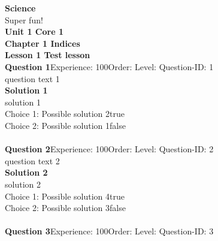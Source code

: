 \documentclass{article}
\begin{document}
\noindent\Huge{\textbf{Science}}\\[5pt]
\noindent\large{Super fun!}\\[20pt]
\noindent\huge{\textbf{Unit 1 Core 1}}\\[18pt]
\noindent\huge{\textbf{Chapter 1 Indices}}\\[15pt]
\noindent\huge{\textbf{Lesson 1 Test lesson}}\\[12pt]
\noindent\textbf{Question 1}\hspace{20pt}Experience: 100\hspace{20pt}Order: \hspace{20pt}Level: \hspace{20pt}Question-ID: 1\\[2pt]
question text 1\\[4pt]
\noindent\textbf{Solution 1}\\[2pt]
solution 1\\[4pt]
Choice 1: \hspace{20pt}Possible solution 2\hspace{20pt}true\\
Choice 2: \hspace{20pt}Possible solution 1\hspace{20pt}false\\
\\[4pt]
\noindent\textbf{Question 2}\hspace{20pt}Experience: 100\hspace{20pt}Order: \hspace{20pt}Level: \hspace{20pt}Question-ID: 2\\[2pt]
question text 2\\[4pt]
\noindent\textbf{Solution 2}\\[2pt]
solution 2\\[4pt]
Choice 1: \hspace{20pt}Possible solution 4\hspace{20pt}true\\
Choice 2: \hspace{20pt}Possible solution 3\hspace{20pt}false\\
\\[4pt]
\noindent\textbf{Question 3}\hspace{20pt}Experience: 100\hspace{20pt}Order: \hspace{20pt}Level: \hspace{20pt}Question-ID: 3\\[2pt]
\end{document}
